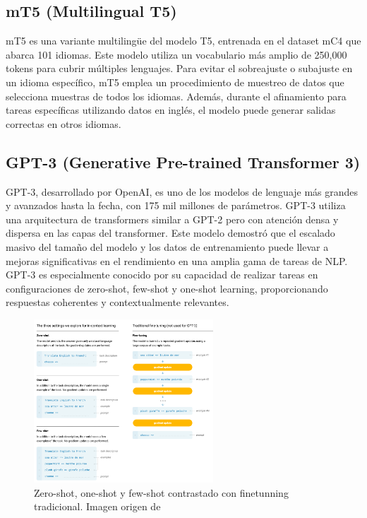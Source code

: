 \subsection{mT5 (Multilingual T5)}
mT5 es una variante multilingüe del modelo T5, entrenada en el dataset mC4 que abarca 101 idiomas. Este modelo utiliza un vocabulario más amplio de 250,000 tokens para cubrir múltiples lenguajes. Para evitar el sobreajuste o subajuste en un idioma específico, mT5 emplea un procedimiento de muestreo de datos que selecciona muestras de todos los idiomas. Además, durante el afinamiento para tareas específicas utilizando datos en inglés, el modelo puede generar salidas correctas en otros idiomas.

\subsection{GPT-3 (Generative Pre-trained Transformer 3)}
GPT-3, desarrollado por OpenAI, es uno de los modelos de lenguaje más grandes y avanzados hasta la fecha, con 175 mil millones de parámetros. GPT-3 utiliza una arquitectura de transformers similar a GPT-2 pero con atención densa y dispersa en las capas del transformer. Este modelo demostró que el escalado masivo del tamaño del modelo y los datos de entrenamiento puede llevar a mejoras significativas en el rendimiento en una amplia gama de tareas de NLP. GPT-3 es especialmente conocido por su capacidad de realizar tareas en configuraciones de zero-shot, few-shot y one-shot learning, proporcionando respuestas coherentes y contextualmente relevantes. \hfill \break

\begin{figure}[h]
\centering
\includegraphics[width=0.6\textwidth]{figuras/capitulo1/gpt3.png}
\caption{Zero-shot, one-shot y few-shot contrastado con finetunning tradicional. Imagen origen de \citep{brown2020language}}
\label{fig:zero}
\end{figure}


